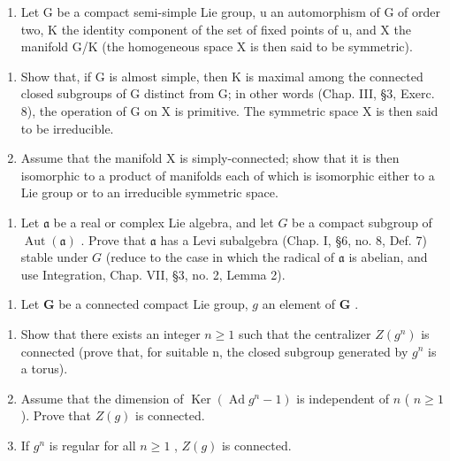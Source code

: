 \begin{enumerate}
\def\labelenumi{\arabic{enumi})}
\setcounter{enumi}{7}
\tightlist
\item
  Let G be a compact semi-simple Lie group, u an automorphism of G of order two, K the identity component of the set of fixed points of u, and X the manifold G/K (the homogeneous space X is then said to be symmetric).
\end{enumerate}

\begin{enumerate}
\def\labelenumi{\alph{enumi})}
\item
  Show that, if G is almost simple, then K is maximal among the connected closed subgroups of G distinct from G; in other words (Chap. III, §3, Exerc. 8), the operation of G on X is primitive. The symmetric space X is then said to be irreducible.
\item
  Assume that the manifold X is simply-connected; show that it is then isomorphic to a product of manifolds each of which is isomorphic either to a Lie group or to an irreducible symmetric space.
\end{enumerate}

\begin{enumerate}
\def\labelenumi{\arabic{enumi})}
\setcounter{enumi}{8}
\tightlist
\item
  Let \(\mathfrak{a}\) be a real or complex Lie algebra, and let \(G\) be a compact subgroup of \(\operatorname{Aut}(\mathfrak{a})\) . Prove that \(\mathfrak{a}\) has a Levi subalgebra (Chap. I, §6, no. 8, Def. 7) stable under \(G\) (reduce to the case in which the radical of \(\mathfrak{a}\) is abelian, and use Integration, Chap. VII, §3, no. 2, Lemma 2).
\end{enumerate}


\begin{enumerate}
\def\labelenumi{\arabic{enumi})}
\tightlist
\item
  Let \(\mathbf{G}\) be a connected compact Lie group, \(g\) an element of \(\mathbf{G}\) .
\end{enumerate}

\begin{enumerate}
\def\labelenumi{\alph{enumi})}
\item
  Show that there exists an integer \(n \geq 1\) such that the centralizer \(Z(g^{n})\) is connected (prove that, for suitable n, the closed subgroup generated by \(g^{n}\) is a torus).
\item
  Assume that the dimension of \(\operatorname{Ker}(\operatorname{Ad}g^n - 1)\) is independent of \(n\) ( \(n \geq 1\) ). Prove that \(Z(g)\) is connected.
\item
  If \(g^n\) is regular for all \(n \geq 1\) , \(Z(g)\) is connected.
\end{enumerate}

